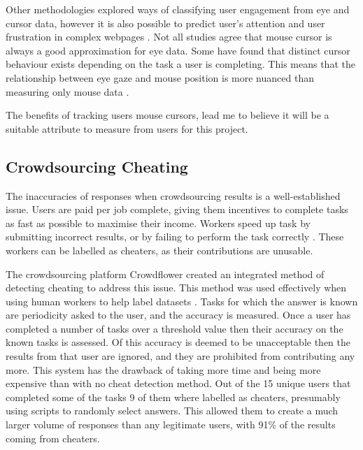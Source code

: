\documentclass{article}
\begin{document}
Other methodologies explored ways of classifying user engagement from eye and cursor data, however it is also possible to predict user's attention and user frustration in complex webpages \cite{navalpakkam2012mouse}.
Not all studies agree that mouse cursor is always a good approximation for eye data. 
Some have found that distinct cursor behaviour exists depending on the task a user is completing.
This means that the relationship between eye gaze and mouse position is more nuanced than measuring only mouse data \cite{huang2012user}.

The benefits of tracking users mouse cursors, lead me to believe it will be a suitable attribute to measure from users for this project. 


\subsection{Crowdsourcing Cheating}



The inaccuracies of responses when crowdsourcing results is a well-established issue.
Users are paid per job complete, giving them incentives to complete tasks as fast as possible to maximise their income.
Workers speed up task by submitting incorrect results, or by failing to perform the task correctly \cite{hirth2013analyzing}.
These workers can be labelled as cheaters, as their contributions are unusable.


The crowdsourcing platform Crowdflower created an integrated method of detecting cheating to address this issue.
This method was used effectively when using human workers to help label datasets \cite{quinn2010crowdflow}.
Tasks for which the answer is known are periodicity asked to the user, and the accuracy is measured.
Once a user has completed a number of tasks over a threshold value then their accuracy on the known tasks is assessed.
Of this accuracy is deemed to be unacceptable then the results from that user are ignored, and they are prohibited from contributing any more.
This system has the drawback of taking more time and being more expensive than with no cheat detection method.
Out of the 15 unique users that completed some of the tasks 9 of them where labelled as cheaters, presumably using scripts to randomly select answers.
This allowed them to create a much larger volume of responses than any legitimate users, with 91\% of the results coming from cheaters.
\end{document}
